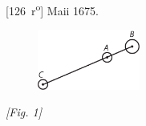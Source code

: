                 \vspace*{8mm}
                \pstart 
                \normalsize
            [126~r\textsuperscript{o}] Maii 1675.  \pend \pstart \begin{figure}                    
                \includegraphics[width=0.3\textwidth]{images/lh03705126r-1}
              
                        \end{figure}
                       \textit{[Fig. 1]} \\
